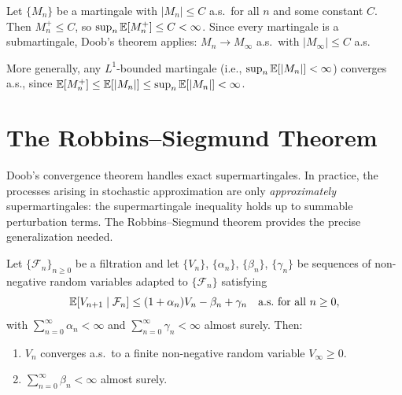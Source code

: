 \documentclass[11pt,a4paper]{article}
\begin{document}
\begin{example}
\label{ex:bounded_martingale}
Let $\{M_n\}$ be a martingale with $|M_n| \leq C$ a.s.\ for all
$n$ and some constant $C$.  Then $M_n^+ \leq C$, so
$\sup_n \mathbb{E}[M_n^+] \leq C < \infty$.  Since every martingale is a
submartingale, Doob's theorem applies: $M_n \to M_\infty$ a.s.\
with $|M_\infty| \leq C$ a.s.

More generally, any $L^1$-bounded martingale (i.e.,
$\sup_n \mathbb{E}[|M_n|] < \infty$) converges a.s., since
$\mathbb{E}[M_n^+] \leq \mathbb{E}[|M_n|] \leq \sup_n \mathbb{E}[|M_n|] < \infty$.
\end{example}


\section{The Robbins--Siegmund Theorem}
\label{sec:robbins_siegmund}

Doob's convergence theorem handles exact supermartingales.  In
practice, the processes arising in stochastic approximation are
only \emph{approximately} supermartingales: the supermartingale
inequality holds up to summable perturbation terms.  The
Robbins--Siegmund theorem provides the precise generalization
needed.

\begin{keyresult}[title={Robbins--Siegmund Theorem}]
\begin{theorem}
\label{thm:robbins_siegmund}
Let $\{\mathcal{F}_n\}_{n \geq 0}$ be a filtration and let
$\{V_n\}$, $\{\alpha_n\}$, $\{\beta_n\}$, $\{\gamma_n\}$ be
sequences of non-negative random variables adapted to
$\{\mathcal{F}_n\}$ satisfying
\begin{equation}
  \mathbb{E}[V_{n+1} \mid \mathcal{F}_n]
  \leq (1 + \alpha_n) V_n - \beta_n + \gamma_n
  \quad \text{a.s.\ for all } n \geq 0,
  \label{eq:robbins_siegmund}
\end{equation}
with $\sum_{n=0}^\infty \alpha_n < \infty$ and
$\sum_{n=0}^\infty \gamma_n < \infty$ almost surely.  Then:
\begin{enumerate}[nosep]
  \item $V_n$ converges a.s.\ to a finite non-negative random
    variable $V_\infty \geq 0$.
  \item $\sum_{n=0}^\infty \beta_n < \infty$ almost surely.
\end{enumerate}
\end{theorem}
\end{keyresult}
\end{document}
